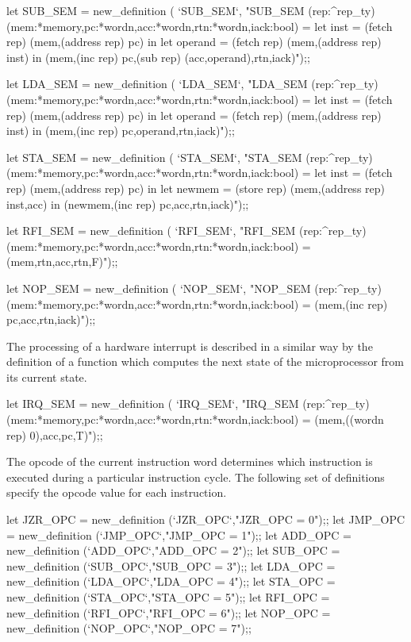 let SUB_SEM = new_definition (
  `SUB_SEM`,
  "SUB_SEM (rep:^rep_ty)
    (mem:*memory,pc:*wordn,acc:*wordn,rtn:*wordn,iack:bool) =
    let inst = (fetch rep) (mem,(address rep) pc) in
    let operand = (fetch rep) (mem,(address rep) inst) in
      (mem,(inc rep) pc,(sub rep) (acc,operand),rtn,iack)");;

let LDA_SEM = new_definition (
  `LDA_SEM`,
  "LDA_SEM (rep:^rep_ty)
    (mem:*memory,pc:*wordn,acc:*wordn,rtn:*wordn,iack:bool) =
    let inst = (fetch rep) (mem,(address rep) pc) in
    let operand = (fetch rep) (mem,(address rep) inst) in
      (mem,(inc rep) pc,operand,rtn,iack)");;

let STA_SEM = new_definition (
  `STA_SEM`,
  "STA_SEM (rep:^rep_ty)
    (mem:*memory,pc:*wordn,acc:*wordn,rtn:*wordn,iack:bool) =
    let inst = (fetch rep) (mem,(address rep) pc) in
    let newmem = (store rep) (mem,(address rep) inst,acc) in
      (newmem,(inc rep) pc,acc,rtn,iack)");;
\endtt

\begintt
let RFI_SEM = new_definition (
  `RFI_SEM`,
  "RFI_SEM (rep:^rep_ty)
    (mem:*memory,pc:*wordn,acc:*wordn,rtn:*wordn,iack:bool) =
    (mem,rtn,acc,rtn,F)");;

let NOP_SEM = new_definition (
  `NOP_SEM`,
  "NOP_SEM (rep:^rep_ty)
    (mem:*memory,pc:*wordn,acc:*wordn,rtn:*wordn,iack:bool) =
    (mem,(inc rep) pc,acc,rtn,iack)");;
\endtt

The processing of a hardware interrupt is described in a similar way
by the definition of a function which computes the next
state of the microprocessor from its current state.

\begintt
let IRQ_SEM = new_definition (
  `IRQ_SEM`,
  "IRQ_SEM (rep:^rep_ty)
    (mem:*memory,pc:*wordn,acc:*wordn,rtn:*wordn,iack:bool) =
    (mem,((wordn rep) 0),acc,pc,T)");;
\endtt

The opcode of the current instruction word determines which
instruction is executed during a particular instruction cycle.
The following set of definitions specify the opcode value for
each instruction.

\begintt
let JZR_OPC = new_definition (`JZR_OPC`,"JZR_OPC = 0");;
let JMP_OPC = new_definition (`JMP_OPC`,"JMP_OPC = 1");;
let ADD_OPC = new_definition (`ADD_OPC`,"ADD_OPC = 2");;
let SUB_OPC = new_definition (`SUB_OPC`,"SUB_OPC = 3");;
let LDA_OPC = new_definition (`LDA_OPC`,"LDA_OPC = 4");;
let STA_OPC = new_definition (`STA_OPC`,"STA_OPC = 5");;
let RFI_OPC = new_definition (`RFI_OPC`,"RFI_OPC = 6");;
let NOP_OPC = new_definition (`NOP_OPC`,"NOP_OPC = 7");;
\endtt

